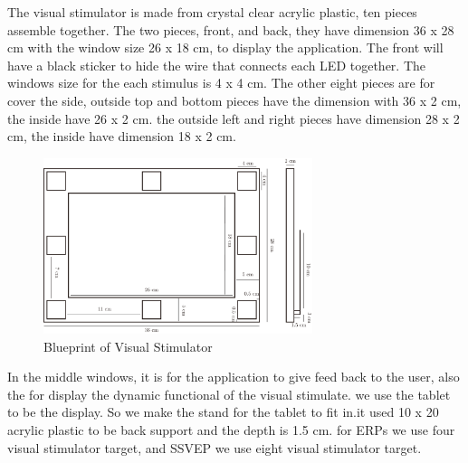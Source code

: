 \hspace{1.5cm}The visual stimulator is made from crystal clear acrylic plastic, ten pieces assemble together. The two pieces, front, and back, they have dimension 36 x 28 cm with the window size 26 x 18 cm, to display the application. The front will have a black sticker to hide the wire that connects each LED together. The windows size for the each stimulus is 4 x 4 cm. The other eight pieces are for cover the side, outside top and bottom pieces have the dimension with 36 x 2 cm, the inside have 26 x 2 cm. the outside left and right pieces have dimension 28 x 2 cm, the inside have dimension 18 x 2  cm.\\





\begin{figure}[ht]
	\centering
	\includegraphics[width=0.7\textwidth]{chapter6/blueprint.pdf}
	\caption{Blueprint of Visual Stimulator}
\end{figure}
In the middle windows, it is for the application to give feed back to the user, also the for display the dynamic functional of the visual stimulate. we use the tablet to be the display. So we make the stand for the tablet to fit in.it used 10 x 20 acrylic plastic to be back support and the depth is 1.5 cm. for ERPs we use four visual stimulator target, and SSVEP we use eight visual stimulator target. 

